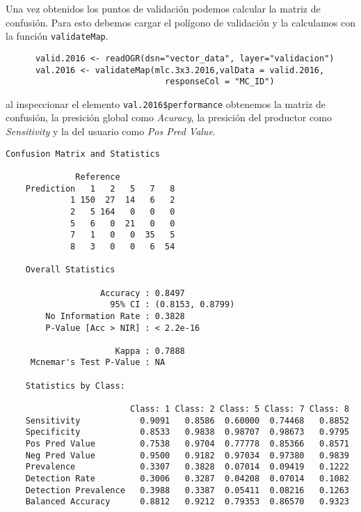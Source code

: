 \begin{exa}

  Una vez obtenidos los puntos de validaci\'on podemos calcular la matriz de confusi\'on.  Para esto debemos cargar el pol\'igono de validaci\'on y la calculamos con la funci\'on \texttt{validateMap}.

  \begin{lstlisting}
      valid.2016 <- readOGR(dsn="vector_data", layer="validacion")
      val.2016 <- validateMap(mlc.3x3.2016,valData = valid.2016,
                                responseCol = "MC_ID")
  \end{lstlisting}

  al inspeccionar el elemento \verb|val.2016$performance| obtenemos la matriz
  de confusi\'on, la presici\'on global como \emph{Acuracy}, la presici\'on del
  productor como \emph{Sensitivity} y la del usuario como \emph{Pos Pred Value}.

  \begin{Verbatim}[fontsize=\small]
    Confusion Matrix and Statistics

              Reference
    Prediction   1   2   5   7   8
             1 150  27  14   6   2
             2   5 164   0   0   0
             5   6   0  21   0   0
             7   1   0   0  35   5
             8   3   0   0   6  54

    Overall Statistics

                   Accuracy : 0.8497
                     95% CI : (0.8153, 0.8799)
        No Information Rate : 0.3828
        P-Value [Acc > NIR] : < 2.2e-16

                      Kappa : 0.7888
     Mcnemar's Test P-Value : NA

    Statistics by Class:

                         Class: 1 Class: 2 Class: 5 Class: 7 Class: 8
    Sensitivity            0.9091   0.8586  0.60000  0.74468   0.8852
    Specificity            0.8533   0.9838  0.98707  0.98673   0.9795
    Pos Pred Value         0.7538   0.9704  0.77778  0.85366   0.8571
    Neg Pred Value         0.9500   0.9182  0.97034  0.97380   0.9839
    Prevalence             0.3307   0.3828  0.07014  0.09419   0.1222
    Detection Rate         0.3006   0.3287  0.04208  0.07014   0.1082
    Detection Prevalence   0.3988   0.3387  0.05411  0.08216   0.1263
    Balanced Accuracy      0.8812   0.9212  0.79353  0.86570   0.9323
  \end{Verbatim}


\end{exa}
